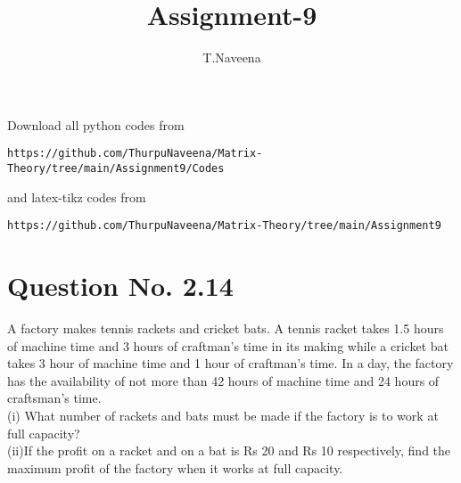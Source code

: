 \documentclass[journal,12pt,twocolumn]{IEEEtran}
\begin{document}
\makeatother
\let\StandardTheFigure\thefigure
\let\vec\mathbf
\renewcommand{\thefigure}{\theproblem}
\def\putbox#1#2#3{\makebox[0in][l]{\makebox[#1][l]{}\raisebox{\baselineskip}[0in][0in]{\raisebox{#2}[0in][0in]{#3}}}}
     \def\rightbox#1{\makebox[0in][r]{#1}}
     \def\centbox#1{\makebox[0in]{#1}}
     \def\topbox#1{\raisebox{-\baselineskip}[0in][0in]{#1}}
     \def\midbox#1{\raisebox{-0.5\baselineskip}[0in][0in]{#1}}
\vspace{3cm}
\title{Assignment-9}
\author{T.Naveena}
\maketitle
\newpage
\bigskip
\renewcommand{\thefigure}{\theenumi}
\renewcommand{\thetable}{\theenumi}
Download all python codes from 
\begin{lstlisting}
https://github.com/ThurpuNaveena/Matrix-Theory/tree/main/Assignment9/Codes
\end{lstlisting}
%
and latex-tikz codes from 
%
\begin{lstlisting}
https://github.com/ThurpuNaveena/Matrix-Theory/tree/main/Assignment9
\end{lstlisting}
%
\section{Question No. 2.14}
A factory makes tennis rackets and cricket bats. A tennis racket takes 1.5 hours
of machine time and 3 hours of craftman’s time in its making while a cricket bat
takes 3 hour of machine time and 1 hour of craftman’s time. In a day, the factory
has the availability of not more than 42 hours of machine time and 24 hours of
craftsman’s time.\\
(i) What number of rackets and bats must be made if the factory is to work
at full capacity?\\
(ii)If the profit on a racket and on a bat is Rs 20 and Rs 10 respectively, find
the maximum profit of the factory when it works at full capacity.
\end{document}
